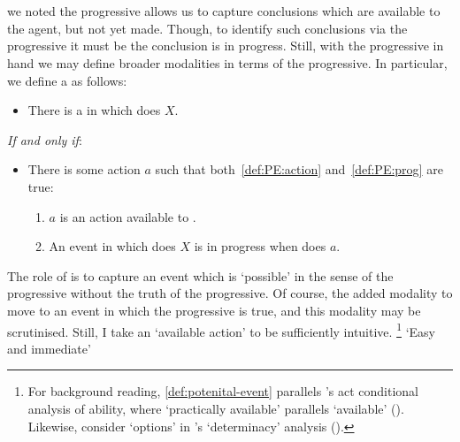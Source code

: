 \section{}
\label{sec:assupp2}

\begin{note}
  we noted the progressive allows us to capture conclusions which are available to the agent, but not yet made.
  Though, to identify such conclusions via the progressive it must be the conclusion is in progress.
  Still, with the progressive in hand we may define broader modalities in terms of the progressive.
  In particular, we define a \pevent{} as follows:

  \begin{definition}[\pevent{3}]%
    \label{def:potenital-event}%
    \begin{itemize}
    \item
      There is a \emph{\pevent{}} in which \vAgent{} does \(X\).
    \end{itemize}

    \emph{If and only if}:

    \begin{itemize}
    \item
      There is some action \(a\) such that both~\ref{def:PE:action} and~\ref{def:PE:prog} are true:

      \begin{enumerate}[label=\alph*., ref=(\alph*)]
      \item
        \label{def:PE:action}
        \(a\) is an action available to \vAgent{}.
      \item
        \label{def:PE:prog}
        An event in which \vAgent{} does \(X\) is in progress when \vAgent{} does \(a\).
      \end{enumerate}
    \end{itemize}
    \vspace{-\baselineskip}
  \end{definition}

  The role of  is to capture an event which is `possible' in the sense of the progressive without the truth of the progressive.
  Of course, the added modality to move to an event in which the progressive is true, and this modality may be scrutinised.
  Still, I take an `available action' to be sufficiently intuitive.%
  \footnote{
    For background reading, \autoref{def:potenital-event} parallels \citeauthor{Mandelkern:2017aa}'s act conditional analysis of ability, where `practically available' parallels `available' (\citeyear[\S5]{Mandelkern:2017aa}).
    Likewise, consider `options' in \citeauthor{Boylan:2020aa}'s `determinacy' analysis (\citeyear[\S4]{Boylan:2020aa}).
  }
  {
    \color{red}
    `Easy and immediate'
  }
\end{note}


